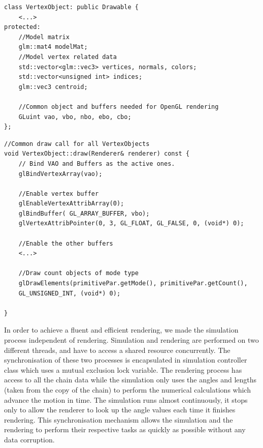 \documentclass[paper=a4, fontsize=11pt]{scrartcl} %
\numberwithin{equation}{section} %
\numberwithin{figure}{section} %
\numberwithin{table}{section} %
\begin{document}
\begin{mdframed}
\begin{scriptsize}
\begin{lstlisting}
class VertexObject: public Drawable {
	<...>
protected:
	//Model matrix
	glm::mat4 modelMat;
	//Model vertex related data
	std::vector<glm::vec3> vertices, normals, colors;
	std::vector<unsigned int> indices;
	glm::vec3 centroid;

	//Common object and buffers needed for OpenGL rendering
	GLuint vao, vbo, nbo, ebo, cbo;
};
\end{lstlisting}
\end{scriptsize}
\end{mdframed}

\begin{mdframed}
\begin{scriptsize}
\begin{lstlisting}
//Common draw call for all VertexObjects
void VertexObject::draw(Renderer& renderer) const {
	// Bind VAO and Buffers as the active ones.
	glBindVertexArray(vao);

	//Enable vertex buffer
	glEnableVertexAttribArray(0);
	glBindBuffer( GL_ARRAY_BUFFER, vbo);
	glVertexAttribPointer(0, 3, GL_FLOAT, GL_FALSE, 0, (void*) 0);
	
	//Enable the other buffers 
	<...>
		
	//Draw count objects of mode type
	glDrawElements(primitivePar.getMode(), primitivePar.getCount(),
	GL_UNSIGNED_INT, (void*) 0);
	
}
\end{lstlisting}
\end{scriptsize}
\end{mdframed}

In order to achieve a fluent and efficient rendering, we made the simulation process independent of rendering. Simulation and rendering are performed on two different threads, and have to access a shared resource concurrently. The synchronisation of these two processes is encapsulated in simulation controller class which uses a mutual exclusion lock variable. The rendering process has access to all the chain data while the simulation only uses the angles and lengths (taken from the copy of the chain) to perform the numerical calculations which advance the motion in time. The simulation runs almost continuously, it stops only to allow the renderer to look up the angle values each time it finishes rendering. This synchronisation mechanism allows the simulation and the rendering to perform their respective tasks as quickly as possible without any data corruption. \\
\end{document}

